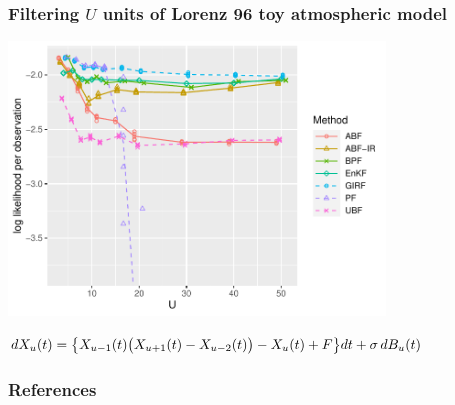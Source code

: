 \documentclass{beamer}
\begin{document}
\begin{frame}
\frametitle{Filtering $U$ units of Lorenz 96 toy atmospheric model} 

\vspace{-3mm}

\begin{center}
\includegraphics[width=10cm]{lz_loglik_plot-1.pdf}

\vspace{-1mm}

$dX_{u}(t) = \big \{  X_{u-1}(t) \big(X_{u+1}(t) - X_{u-2}(t)\big) - X_{u}(t) + F \big\} dt + \sigma \, dB_{u}(t)$

\end{center}

\end{frame}


\nocite{asfaw23arxiv,bjornstad01,breto19,grenfell04,he10,katzfuss19,ionides21,ionides22,lee20,li20,ng02,ning23-ibpf,park20,rebeschini15,wheeler23}

\begin{frame}[allowframebreaks]
\frametitle{References}


\end{frame}

\end{document}
